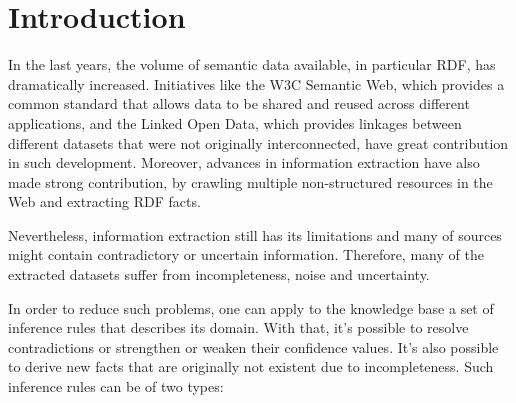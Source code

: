 \chapter{Introduction}
\label{ch:intro}

In the last years, the volume of semantic data available, in particular RDF, has dramatically increased. Initiatives like the W3C Semantic Web, which provides a common standard that allows data to be shared and reused across different applications, and the Linked Open Data, which provides linkages between different datasets that were not originally interconnected, have great contribution in such development. Moreover, advances in information extraction have also made strong contribution, by crawling multiple non-structured resources in the Web and extracting RDF facts.

Nevertheless, information extraction still has its limitations and many of sources might contain contradictory or uncertain information. Therefore, many of the extracted datasets suffer from incompleteness, noise and uncertainty.

In order to reduce such problems, one can apply to the knowledge base a set of inference rules that describes its domain. With that, it's possible to resolve contradictions or strengthen or weaken their confidence values. It's also possible to derive new facts that are originally not existent due to incompleteness. Such inference rules can be of two types:

